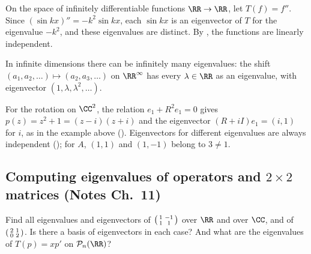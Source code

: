 \documentclass[10pt]{scrartcl}
\newcommand{\PP}{\mathcal P}\newcommand{\LL}{\mathcal L}\newcommand{\MM}{\mathcal M}\newcommand{\T}{\mathsf T}
\begin{document}
\begin{example*}
  On the space of infinitely differentiable functions $\RR\to\RR$, let $T(f)=f''$. Since $(\sin kx)''=-k^2\sin kx$, each $\sin kx$ is an eigenvector of $T$ for the eigenvalue $-k^2$, and these eigenvalues are distinct. By , the functions are linearly independent.
\end{example*}

In infinite dimensions there can be infinitely many eigenvalues: the shift $(a_1,a_2,\dots)\mapsto(a_2,a_3,\dots)$ on $\RR^\infty$ has every $\lambda\in\RR$ as an eigenvalue, with eigenvector $(1,\lambda,\lambda^2,\dots)$.

\revisit For the rotation on $\CC^2$, the relation $e_1+R^2e_1=0$ gives $p(z)=z^2+1=(z-i)(z+i)$ and the eigenvector $(R+iI)e_1=(i,1)$ for $i$, as in the example above (). Eigenvectors for different eigenvalues are always independent (); for $A$, $(1,1)$ and $(1,-1)$ belong to $3\ne1$.

\subsection{Computing eigenvalues of operators and $2\times 2$ matrices (Notes Ch.~11)}

\begin{qbox}
  Find all eigenvalues and eigenvectors of $\begin{psmallmatrix}1&-1\\1&1\end{psmallmatrix}$ over $\RR$ and over $\CC$, and of $\begin{psmallmatrix}2&1\\0&2\end{psmallmatrix}$. Is there a basis of eigenvectors in each case? And what are the eigenvalues of $T(p)=xp'$ on $\PP_n(\RR)$?
\end{qbox}
\end{document}
